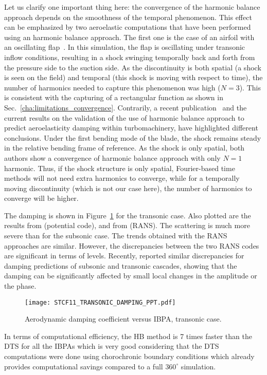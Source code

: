 Let us clarify one important thing here: 
the convergence of the harmonic balance approach depends
on the smoothness of the temporal phenomenon.
This effect can be emphasized by two 
aeroelastic computations that have been performed 
using an harmonic balance approach. 
The first one is the case of 
an airfoil with an oscillating 
flap~\cite{JDufour2009}. In this simulation, the flap is oscillating
under transonic inflow conditions, resulting in a shock swinging temporally
back and forth from the pressure side to the
suction side. As the discontinuity is
both spatial (a shock is seen on the field) and temporal
(this shock is moving with respect to time), the number
of harmonics needed to capture this phenomenon was high ($N=3$). This is
consistent with the capturing of a rectangular function
as shown in Sec.~\ref{cha:limitations_convergence}.
Contrarily, a recent publication~\cite{Huang2013a} and the
current results on the validation
of the use of harmonic balance approach to predict
aeroelasticity damping within turbomachinery, have highlighted
different conclusions. Under the first bending mode
of the blade, the shock remains steady in the relative bending frame
of reference. As the shock
is only spatial, both authors show a convergence of 
harmonic balance approach with only $N=1$ harmonic. Thus, if the shock
structure is only spatial, Fourier-based time methods will not need
extra harmonics to converge, while for a temporally moving discontinuity
(which is not our case here), the number
of harmonics to converge will be higher.

The damping is shown in Figure~\ref{fig:stcf11_transonic_damping} for
the transonic case. Also plotted are the results from
\citet{Fransson1999} (potential code), and 
from \citet{Cinnella2004} (RANS). The scattering is much more severe
than for the subsonic case. The trends obtained with the RANS approaches are similar. However, the
discrepancies between the two RANS codes are significant in terms of
levels.
Recently, \citet{Vogt2011} reported similar discrepancies 
for damping predictions of subsonic and transonic cascades, 
showing that the damping can be significantly affected by 
small local changes in the amplitude or the phase.
\begin{figure}[htp]
  \centering
  \texttt{[image: STCF11\_TRANSONIC\_DAMPING\_PPT.pdf]}
  \caption{Aerodynamic damping coefficient versus IBPA, transonic case.}
  \label{fig:stcf11_transonic_damping}
\end{figure}

In terms of computational efficiency, the HB method is 7 times faster
than the DTS for all the IBPAs which is very good considering 
that the DTS computations
were done using chorochronic boundary conditions which already
provides computational savings compared to a
full $360^\circ$ simulation.
